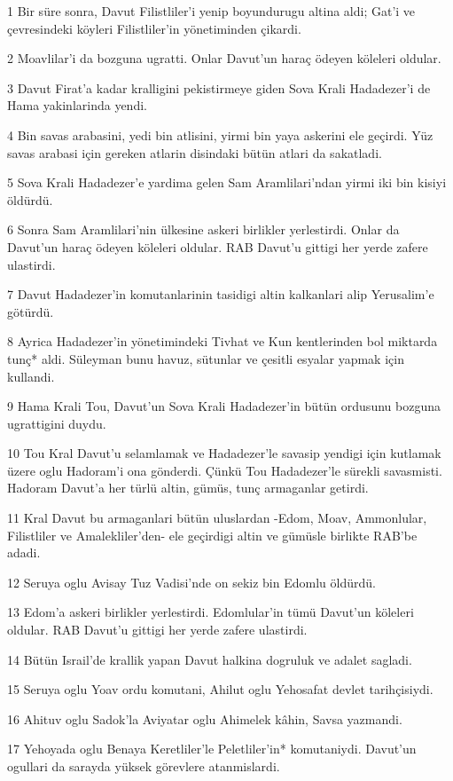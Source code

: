 \par 1 Bir süre sonra, Davut Filistliler'i yenip boyundurugu altina aldi; Gat'i ve çevresindeki köyleri Filistliler'in yönetiminden çikardi.
\par 2 Moavlilar'i da bozguna ugratti. Onlar Davut'un haraç ödeyen köleleri oldular.
\par 3 Davut Firat'a kadar kralligini pekistirmeye giden Sova Krali Hadadezer'i de Hama yakinlarinda yendi.
\par 4 Bin savas arabasini, yedi bin atlisini, yirmi bin yaya askerini ele geçirdi. Yüz savas arabasi için gereken atlarin disindaki bütün atlari da sakatladi.
\par 5 Sova Krali Hadadezer'e yardima gelen Sam Aramlilari'ndan yirmi iki bin kisiyi öldürdü.
\par 6 Sonra Sam Aramlilari'nin ülkesine askeri birlikler yerlestirdi. Onlar da Davut'un haraç ödeyen köleleri oldular. RAB Davut'u gittigi her yerde zafere ulastirdi.
\par 7 Davut Hadadezer'in komutanlarinin tasidigi altin kalkanlari alip Yerusalim'e götürdü.
\par 8 Ayrica Hadadezer'in yönetimindeki Tivhat ve Kun kentlerinden bol miktarda tunç* aldi. Süleyman bunu havuz, sütunlar ve çesitli esyalar yapmak için kullandi.
\par 9 Hama Krali Tou, Davut'un Sova Krali Hadadezer'in bütün ordusunu bozguna ugrattigini duydu.
\par 10 Tou Kral Davut'u selamlamak ve Hadadezer'le savasip yendigi için kutlamak üzere oglu Hadoram'i ona gönderdi. Çünkü Tou Hadadezer'le sürekli savasmisti. Hadoram Davut'a her türlü altin, gümüs, tunç armaganlar getirdi.
\par 11 Kral Davut bu armaganlari bütün uluslardan -Edom, Moav, Ammonlular, Filistliler ve Amalekliler'den- ele geçirdigi altin ve gümüsle birlikte RAB'be adadi.
\par 12 Seruya oglu Avisay Tuz Vadisi'nde on sekiz bin Edomlu öldürdü.
\par 13 Edom'a askeri birlikler yerlestirdi. Edomlular'in tümü Davut'un köleleri oldular. RAB Davut'u gittigi her yerde zafere ulastirdi.
\par 14 Bütün Israil'de krallik yapan Davut halkina dogruluk ve adalet sagladi.
\par 15 Seruya oglu Yoav ordu komutani, Ahilut oglu Yehosafat devlet tarihçisiydi.
\par 16 Ahituv oglu Sadok'la Aviyatar oglu Ahimelek kâhin, Savsa yazmandi.
\par 17 Yehoyada oglu Benaya Keretliler'le Peletliler'in* komutaniydi. Davut'un ogullari da sarayda yüksek görevlere atanmislardi.

